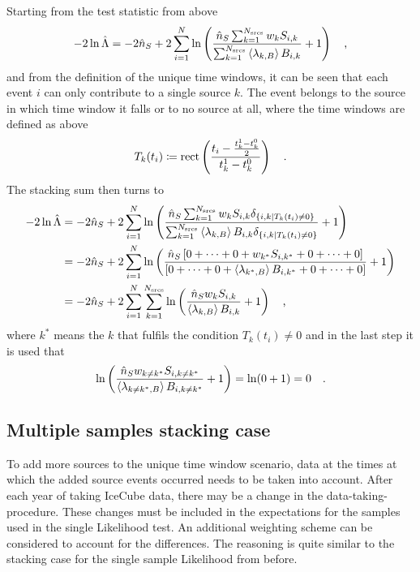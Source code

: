 Starting from the test statistic from above
\begin{equation}
  -2\ln\hat{\Lambda}
  = -2\hat{n}_S +
      2\sum_{i=1}^N \ln\left(
        \frac{\hat{n}_S \sum_{k=1}^{N_\text{srcs}} w_k S_{i,k}}
             {\sum_{k=1}^{N_\text{srcs}}\Braket{\lambda_{k,B}} B_{i,k}}
        + 1
      \right)
  \quad\text{,}
\end{equation}
and from the definition of the unique time windows, it can be seen that each event $i$ can only contribute to a single source $k$.
The event belongs to the source in which time window it falls or to no source at all, where the time windows are defined as above
\begin{equation}
  T_k(t_i) \coloneqq \operatorname{rect} \left(
    \frac{t_i - \frac{t_k^1-t_k^0}{2}} {t_k^1-t_k^0}
  \right)
  \quad\text{.}
\end{equation}
The stacking sum then turns to
\begin{align}
  -2\ln\hat{\Lambda}
  &= -2\hat{n}_S +
      2\sum_{i=1}^N \ln\left(
        \frac{\hat{n}_S \sum_{k=1}^{N_\text{srcs}} w_k S_{i,k}
              \delta_{\{i,k|T_k(t_i)\neq 0\}}}
             {\sum_{k=1}^{N_\text{srcs}}\Braket{\lambda_{k,B}} B_{i,k}
              \delta_{\{i,k|T_k(t_i)\neq 0\}}}
        + 1
      \right) \\
  &= -2\hat{n}_S +
      2\sum_{i=1}^N \ln\left(
        \frac{\hat{n}_S \left[0+\dots+0+ w_{k^*} S_{i,k^*} +0+\dots+0\right]}
             {\left[
              0+\dots+0+ \Braket{\lambda_{k^*,B}} B_{i,k^*} +0+\dots+0
              \right]}
        + 1
      \right) \\
  &= -2\hat{n}_S +
      2\sum_{i=1}^N \sum_{k=1}^{N_\text{srcs}} \ln\left(
        \frac{\hat{n}_S w_k S_{i,k}}{\Braket{\lambda_{k,B}} B_{i,k}}
        + 1
      \right)
  \quad\text{,}
\end{align}
where $k^*$ means the $k$ that fulfils the condition $T_k(t_i)\neq 0$ and in the last step it is used that
\begin{equation}
  \ln\left(
      \frac{\hat{n}_S w_{k\neq k^*} S_{i,k\neq k^*}}
           {\Braket{\lambda_{k\neq k^*,B}} B_{i,k\neq k^*}}
      + 1
    \right)
    = \ln(0 + 1) = 0
  \quad\text{.}
\end{equation}

\subsection{Multiple samples stacking case}
To add more sources to the unique time window scenario, data at the times at which the added source events occurred needs to be taken into account.
After each year of taking IceCube data, there may be a change in the data-taking-procedure.
These changes must be included in the expectations for the samples used in the single Likelihood test.
An additional weighting scheme can be considered to account for the differences.
The reasoning is quite similar to the stacking case for the single sample Likelihood from before.

